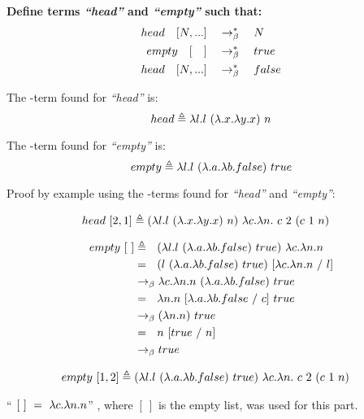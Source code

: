 \documentclass{article}
\begin{document}
	\begin{Large}
		\textbf{Define terms \textit{``head''} and \textit{``empty''} such that:}
		\begin{align*}
			head \quad [ N, ...] &\quad \rightarrow_\beta^*\quad  N\\
			empty \quad [\quad] &\quad \rightarrow_\beta^*\quad true\\
			head \quad [ N, ...] &\quad \rightarrow_\beta^*\quad false
		\end{align*}
		\newline
		
		The \lamb -term found for \textit{``head''} is:
		\begin{equation*}
			head \triangleq \la l.l \ (\la .x.\la y.x) \ n
		\end{equation*}
		
		The \lamb -term found for \textit{``empty''} is:
		\begin{equation*}
			empty \triangleq \la l.l \ (\la .a.\la b.false) \ true
		\end{equation*}
		\newline
		
		Proof by example using the \lamb -terms found for  \textit{``head''} and \textit{``empty''}:
		
		\begin{align*}
			head \ [2,1] &\triangleq (\la l.l \ (\la .x.\la y.x) \ n) \ \la c.\la n. \ c \ 2 \ (c \ 1 \ n)
		\end{align*}
		
		\begin{align*}
			empty \ [ \ ] &\triangleq \, \, \, \, (\lambda l.l \ (\lambda .a.\lambda b.false) \ true) \ \lambda c.\lambda n.n \\
			&= \, \, \, \, (l \ (\lambda .a.\lambda b.false) \ true) \ [\lambda c.\lambda n.n \ / \ l] \\
			&\rightarrow_\beta \lambda c.\lambda n.n \ (\lambda .a.\lambda b.false) \ true \\
			&= \, \, \, \, \lambda n.n \ [\lambda .a.\lambda b.false \ / \ c] \ true \\
			&\rightarrow_\beta (\lambda n.n) \ true \\
			&= \, \, \, \, n \ [true \ / \ n] \\
			&\rightarrow_\beta true
		\end{align*}
		
		\begin{align*}
			empty \ [1,2] &\triangleq (\lambda l.l \ (\lambda .a.\lambda b.false) \ true) \ \lambda c.\lambda n. \ c \ 2 \ (c \ 1 \ n)
		\end{align*}
		
		``$ \ [ \ ] \ = \ \lambda c.\lambda n.n$'' , where $[ \ ]$ is the empty list, was used for this part.
		
	\end{Large}
	\newpage
\end{document}
